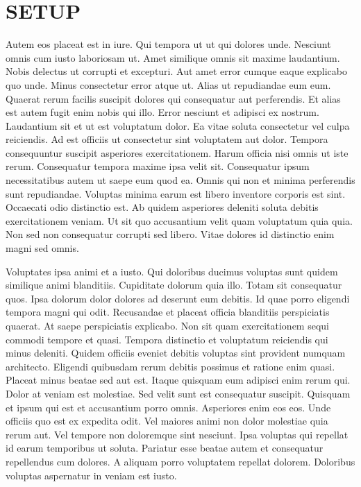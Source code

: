 
\section*{SETUP}


Autem eos placeat est in iure. Qui tempora ut ut qui dolores unde. Nesciunt
omnis cum iusto laboriosam ut. Amet similique omnis sit maxime laudantium.
Nobis delectus ut corrupti et excepturi. Aut amet error cumque eaque explicabo
quo unde. Minus consectetur error atque ut. Alias ut repudiandae eum eum.
Quaerat rerum facilis suscipit dolores qui consequatur aut perferendis. Et
alias est autem fugit enim nobis qui illo. Error nesciunt et adipisci ex
nostrum. Laudantium sit et ut est voluptatum dolor. Ea vitae soluta consectetur
vel culpa reiciendis. Ad est officiis ut consectetur sint voluptatem aut dolor.
Tempora consequuntur suscipit asperiores exercitationem. Harum officia nisi
omnis ut iste rerum. Consequatur tempora maxime ipsa velit sit. Consequatur
ipsum necessitatibus autem ut saepe eum quod ea. Omnis qui non et minima
perferendis sunt repudiandae. Voluptas minima earum est libero inventore
corporis est sint. Occaecati odio distinctio est. Ab quidem asperiores deleniti
soluta debitis exercitationem veniam. Ut sit quo accusantium velit quam
voluptatum quia quia. Non sed non consequatur corrupti sed libero. Vitae
dolores id distinctio enim magni sed omnis.

Voluptates ipsa animi et a iusto. Qui doloribus ducimus voluptas sunt quidem
similique animi blanditiis. Cupiditate dolorum quia illo. Totam sit consequatur
quos. Ipsa dolorum dolor dolores ad deserunt eum debitis. Id quae porro
eligendi tempora magni qui odit. Recusandae et placeat officia blanditiis
perspiciatis quaerat. At saepe perspiciatis explicabo. Non sit quam
exercitationem sequi commodi tempore et quasi. Tempora distinctio et voluptatum
reiciendis qui minus deleniti. Quidem officiis eveniet debitis voluptas sint
provident numquam architecto. Eligendi quibusdam rerum debitis possimus et
ratione enim quasi. Placeat minus beatae sed aut est. Itaque quisquam eum
adipisci enim rerum qui. Dolor at veniam est molestiae. Sed velit sunt est
consequatur suscipit. Quisquam et ipsum qui est et accusantium porro omnis.
Asperiores enim eos eos. Unde officiis quo est ex expedita odit. Vel maiores
animi non dolor molestiae quia rerum aut. Vel tempore non doloremque sint
nesciunt. Ipsa voluptas qui repellat id earum temporibus ut soluta. Pariatur
esse beatae autem et consequatur repellendus cum dolores. A aliquam porro
voluptatem repellat dolorem. Doloribus voluptas aspernatur in veniam est iusto.

